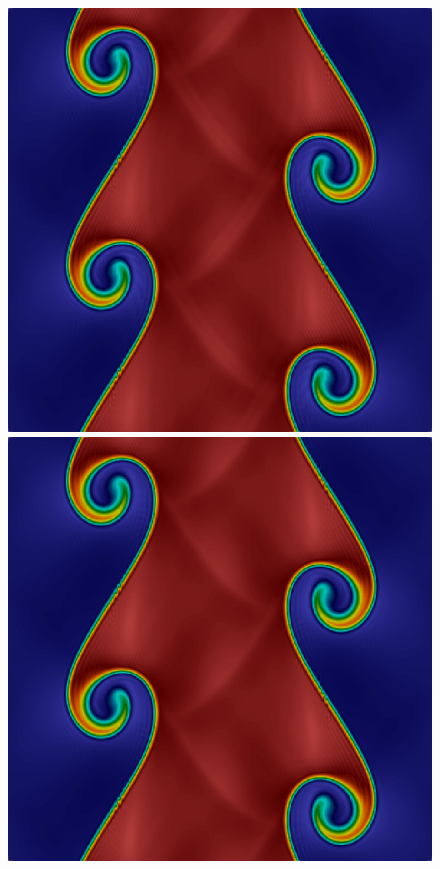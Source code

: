 \begin{figure}[h!]
\includegraphics[scale=0.115]{data/Compressible_Euler/KH/Snapshots/density_200_768.png}\hspace{1em}
\includegraphics[scale=0.115]{data/Compressible_Euler/KH/Snapshots/density_500_768.png}\hspace{1em}

\end{figure}
